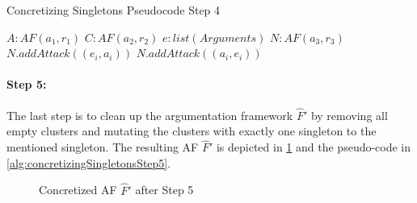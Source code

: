 \begin{algorithm}[H]
    \caption{Concretizing Singletons Pseudocode Step 4}\label{alg:concretizingSingletonsStep4}
    \begin{algorithmic}[1]
        \Require $A: AF(a_1, r_1)$ 
        \Require $C: AF(a_2, r_2)$ 
        \Require $e: list(Arguments)$ 
        \Require $N: AF(a_3, r_3)$ 
                    \State $N.addAttack((e_i, a_i))$
                \EndIf
            \EndFor
                    \State $N.addAttack((a_i, e_i))$
                \EndIf
            \EndFor
        \EndFor
    \end{algorithmic}
\end{algorithm}


\paragraph{Step 5:} The last step is to clean up the argumentation framework $\hat{F}'$ by removing all empty clusters and mutating the clusters with exactly
one singleton to the mentioned singleton. The resulting AF $\hat{F}'$ is depicted in \cref{example:algorithmConcretizeSingletonsStep5} and the pseudo-code in \cref{alg:concretizingSingletonsStep5}.


\vspace{0.3cm}
\begin{figure}[h!]
    \centering
    \caption{Concretized AF $\hat{F}'$ after Step 5}
    \label{example:algorithmConcretizeSingletonsStep5}
\end{figure}
\vspace{-0.2cm}

